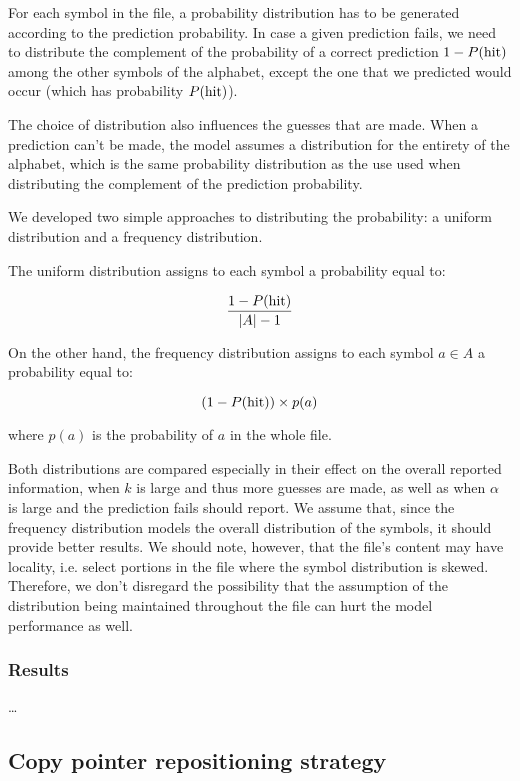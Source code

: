 \documentclass{article}
\begin{document}
For each symbol in the file, a probability distribution has to be generated according to the prediction probability.
In case a given prediction fails, we need to distribute the complement of the probability of a correct prediction $1 - P(\textnormal{hit})$ among the other symbols of the alphabet, except the one that we predicted would occur (which has probability $P(\textnormal{hit})$).

The choice of distribution also influences the guesses that are made.
When a prediction can't be made, the model assumes a distribution for the entirety of the alphabet, which is the same probability distribution as the use used when distributing the complement of the prediction probability.

We developed two simple approaches to distributing the probability: a uniform distribution and a frequency distribution.

The uniform distribution assigns to each symbol a probability equal to:

$$
\frac{1 - P(\textnormal{hit})}{\vert A \vert - 1}
$$

On the other hand, the frequency distribution assigns to each symbol $a \in A$ a probability equal to:

$$
(1 - P(\textnormal{hit})) \times p(a)
$$

where $p(a)$ is the probability of $a$ in the whole file.

Both distributions are compared especially in their effect on the overall reported information, when $k$ is large and thus more guesses are made, as well as when $\alpha$ is large and the prediction fails should report.
We assume that, since the frequency distribution models the overall distribution of the symbols, it should provide better results.
We should note, however, that the file's content may have locality, i.e. select portions in the file where the symbol distribution is skewed.
Therefore, we don't disregard the possibility that the assumption of the distribution being maintained throughout the file can hurt the model performance as well.

\subsubsection{Results}

\dots

\subsection{Copy pointer repositioning strategy}
\end{document}
